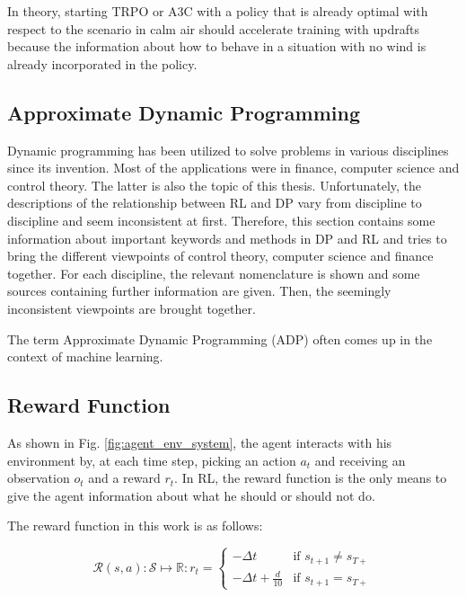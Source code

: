 In theory, starting TRPO or A3C with a policy that is already optimal with respect to the scenario in calm air should accelerate training with updrafts because the information about how to behave in a situation with no wind is already incorporated in the policy.

\subsection{Approximate Dynamic Programming}

Dynamic programming has been utilized to solve problems in various disciplines since its invention. Most of the applications were in finance, computer science and control theory. The latter is also the topic of this thesis. Unfortunately, the descriptions of the relationship between RL and DP vary from discipline to discipline and seem inconsistent at first. Therefore, this section contains some information about important keywords and methods in DP and RL and tries to bring the different viewpoints of control theory, computer science and finance together. For each discipline, the relevant nomenclature is shown and some sources containing further information are given. Then, the seemingly inconsistent viewpoints are brought together.



The term Approximate Dynamic Programming (ADP)  often comes up in the context of machine learning. 

\subsection{Reward Function}
\label{sec:reward-function}

As shown in Fig. \ref{fig:agent_env_system}, the agent interacts with his environment by, at each time step, picking an action $a_t$ and receiving an observation $o_t$ and a reward $r_t$. In RL, the reward function is the only means to give the agent information about what he should or should not do.

The reward function in this work is as follows:

\begin{equation}
\mathcal{R}(s,a): \mathcal{S} \mapsto \mathbb{R}: r_t =
\begin{cases}
-\Delta t & \text{if } s_{t+1} \neq s_{T+}\\
-\Delta t + \frac{d}{10} & \text{if } s_{t+1} = s_{T+}
\end{cases}
\label{eq:reward_function}
\end{equation}

